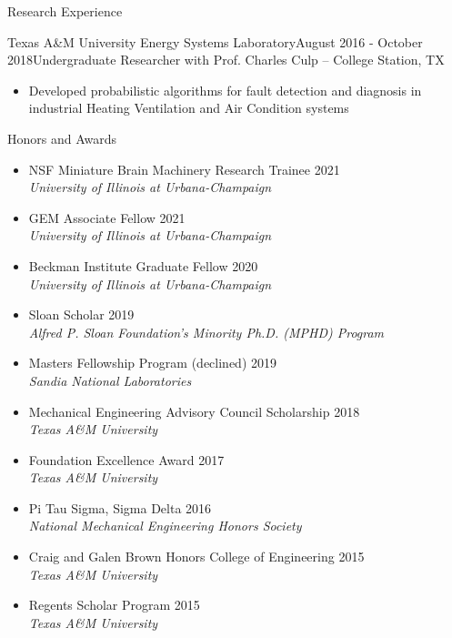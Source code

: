 \documentclass{resume} %
\begin{document}
\begin{rSection}{Research Experience}
\begin{rSubsection}{Texas A\&M University Energy Systems Laboratory}{August 2016 - October 2018}{Undergraduate Researcher with Prof. Charles Culp -- College Station, TX}
\begin{itemize}
    \setlength\itemsep{0em}
    \item Developed probabilistic algorithms for fault detection and diagnosis in industrial Heating Ventilation and Air Condition systems
\end{itemize}
\end{rSubsection}
\end{rSection}


\begin{rSection}{Honors and Awards}
\begin{itemize}[label={}]
    \setlength\itemsep{0em}
    \item NSF Miniature Brain Machinery Research Trainee \hfill 2021 \\ 
    \textit{University of Illinois at Urbana-Champaign}
    \item GEM Associate Fellow \hfill 2021 \\ 
    \textit{University of Illinois at Urbana-Champaign}
    \item Beckman Institute Graduate Fellow \hfill 2020 \\
    \textit{University of Illinois at Urbana-Champaign}
    \item Sloan Scholar \hfill 2019 \\
    \textit{Alfred P. Sloan Foundation's Minority Ph.D. (MPHD) Program}
    \item Masters Fellowship Program (declined) \hfill 2019 \\
    \textit{Sandia National Laboratories}
    \item Mechanical Engineering Advisory
    Council Scholarship \hfill 2018 \\ \textit{Texas A\&M University}
    \item Foundation Excellence Award \hfill 2017 \\ \textit{Texas A\&M
    University}
    \item Pi Tau Sigma, Sigma Delta \hfill \hfill 2016 \\ \textit{National Mechanical
    Engineering Honors Society} 
    \item Craig and Galen Brown Honors College of Engineering \hfill 2015 \\
    \textit{Texas A\&M University}
    \item Regents Scholar Program \hfill 2015\\ \textit{Texas A\&M University}
\end{itemize}
\end{rSection}
\end{document}
